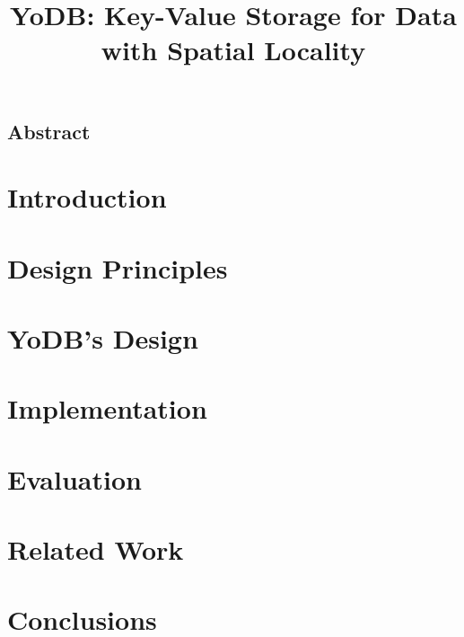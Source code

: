 \documentclass[sigplan,10pt]{acmart}
\date{}
\newcommand{\sys}{YoDB}
\begin{document}
\title{\Large \bf \sys: Key-Value Storage for Data with Spatial Locality} 
\author{}

\maketitle

\subsection*{Abstract}


\section{Introduction}


\section{Design Principles}
\label{sec:principles}

\section{\sys's Design}
\label{sec:design}


\section{Implementation}
\label{sec:impl}


\section{Evaluation}
\label{sec:eval}


\section{Related Work}
\label{sec:related}


\section{Conclusions}
\label{sec:conclusions}


%

\clearpage
{\normalsize 
}

\end{document}
